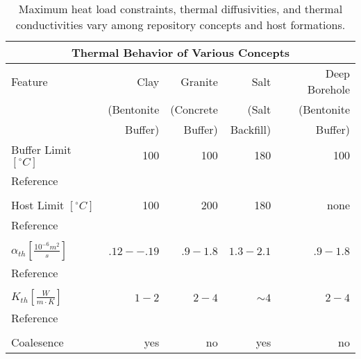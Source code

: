 %
\begin{table}[h!]
  \centering
  \footnotesize{
  \begin{tabular}{|l|r|r|r|r|}
    \multicolumn{5}{c}{\textbf{Thermal Behavior of Various Concepts}}\\
    \hline
    Feature & Clay & Granite & Salt & Deep Borehole \\ 
            & (Bentonite & (Concrete & (Salt & (Bentonite\\ 
            & Buffer) & Buffer) & Backfill) & Buffer) \\ 
    \hline
    Buffer Limit $[^{\circ}C]$ & 100  & 100  & 180 & 100  \\ 
    Reference
    & \cite{<++>}   
    & \cite{<++>}   
    & \cite{<++>}   
    & \cite{<++>}   \\
    &      &      &     &      \\
    Host Limit $[^{\circ}C]$   & 100  & 200  & 180 & none \\ 
    Reference                     
    & \cite{<++>}   
    & \cite{<++>}   
    & \cite{<++>}   
    & \cite{<++>}   \\
    &      &      &     &      \\
    $\alpha_{th} [\frac{10^{-6}m^2}{s}]$ & $.12--.19$ & $.9-1.8$ & $1.3-2.1$ & $.9-1.8$ \\ 
    Reference                     
    & \cite{tikhonravova_effect_2007} 
    & \cite{durham_thermal_1987,hardin_generic_2011,kim_thermal_2007}     
    & \cite{hardin_generic_2011,nieland_storage_2001}   
    & \cite{durham_thermal_1987,hardin_generic_2011,kim_thermal_2007}   \\ 
    &      &      &     &      \\
    $K_{th} [\frac{W}{m{\cdot}K}]$ & $1-2$ & $2-4$ & $\sim4$  & $2-4$ \\ 
    Reference                     
    & \cite{hardin_generic_2011,tikhonravova_effect_2007}    
    & \cite{hardin_generic_2011,kim_thermal_2007,surma_porosity_2003,ab_long-term_2006}    
    & \cite{hardin_generic_2011,nieland_storage_2001}
    & \cite{hardin_generic_2011,kim_thermal_2007,surma_porosity_2003}\\ 
    &      &      &     &      \\
    Coalesence & yes & no & yes & no \\ 
    \hline
  \end{tabular}
  \caption[Models for Heat Transport for Various Geologies]{Maximum heat load constraints, thermal 
  diffusivities, and thermal conductivities vary among repository concepts and host formations. }
  }
  \label{tab:heat_tab}
\end{table}
